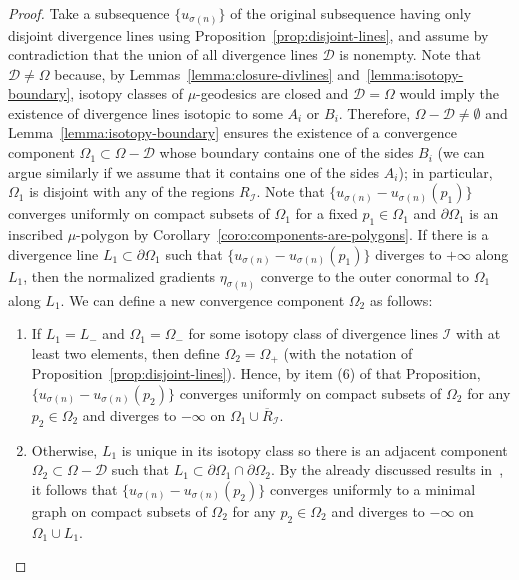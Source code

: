 \documentclass[a4paper,10pt,reqno]{amsart}
\newcommand{\sm}{-}
\theoremstyle{definition}
\theoremstyle{remark}
\numberwithin{equation}{section}
\begin{document}
\begin{proof}
Take a subsequence $\{u_{\sigma(n)}\}$ of the original subsequence having only disjoint divergence lines using Proposition~\ref{prop:disjoint-lines}, and assume by contradiction that the union of all divergence lines $\mathcal D$ is nonempty. Note that $\mathcal D\neq\Omega$ because, by Lemmas~\ref{lemma:closure-divlines} and~\ref{lemma:isotopy-boundary}, isotopy classes of $\mu$-geodesics are closed and $\mathcal D=\Omega$ would imply the existence of divergence lines isotopic to some $A_i$ or $B_i$. Therefore, $\Omega\sm\mathcal D\neq\emptyset$ and Lemma~\ref{lemma:isotopy-boundary} ensures the existence of a convergence component $\Omega_1\subset\Omega\sm\mathcal D$ whose boundary contains one of the sides $B_i$ (we can argue similarly if we assume that it contains one of the sides $A_i$); in particular, $\Omega_1$ is disjoint with any of the regions $R_{\mathcal I}$. Note that $\{u_{\sigma(n)}-u_{\sigma(n)}(p_1)\}$ converges uniformly on compact subsets of $\Omega_1$ for a fixed $p_1\in\Omega_1$ and $\partial\Omega_1$ is an inscribed $\mu$-polygon by Corollary~\ref{coro:components-are-polygons}. If there is a divergence line $L_1\subset\partial\Omega_1$ such that $\{u_{\sigma(n)}-u_{\sigma(n)}(p_1)\}$ diverges to $+\infty$ along $L_1$, then the normalized gradients $\eta_{\sigma(n)}$ converge to the outer conormal to $\Omega_1$ along $L_1$. We can define a new convergence component $\Omega_2$ as follows:
\begin{enumerate}
	\item If $L_1=L_-$ and $\Omega_1=\Omega_-$ for some isotopy class of divergence lines $\mathcal I$ with at least two elements, then define $\Omega_2=\Omega_+$ (with the notation of Proposition~\ref{prop:disjoint-lines}). Hence, by item (6) of that Proposition, $\{u_{\sigma(n)}-u_{\sigma(n)}(p_2)\}$ converges uniformly on compact subsets of $\Omega_2$ for any $p_2\in\Omega_2$ and diverges to $-\infty$ on $\Omega_1\cup\overline R_{\mathcal I}$.
	\item Otherwise, $L_1$ is unique in its isotopy class so there is an adjacent component $\Omega_2\subset\Omega\sm\mathcal D$ such that $L_1\subset\partial\Omega_1\cap\partial\Omega_2$. By the already discussed results in~\cite{MRR}, it follows that $\{u_{\sigma(n)}-u_{\sigma(n)}(p_2)\}$ converges uniformly to a minimal graph on compact subsets of $\Omega_2$ for any $p_2\in\Omega_2$ and diverges to $-\infty$ on $\Omega_1\cup L_1$.
\end{enumerate}

\end{proof}
\end{document}
